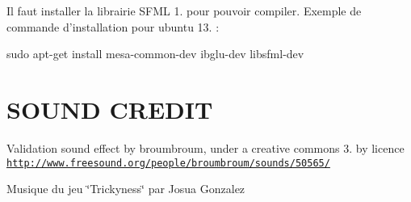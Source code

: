Il faut installer la librairie S\-F\-M\-L 1. pour pouvoir compiler. Exemple de commande d'installation pour ubuntu 13. \-:

sudo apt-\/get install mesa-\/common-\/dev ibglu-\/dev libsfml-\/dev

\section*{S\-O\-U\-N\-D C\-R\-E\-D\-I\-T}

Validation sound effect by broumbroum, under a creative commons 3. by licence \href{http://www.freesound.org/people/broumbroum/sounds/50565/}{\tt http\-://www.\-freesound.\-org/people/broumbroum/sounds/50565/}

Musique du jeu \char`\"{}\-Trickyness\char`\"{} par Josua Gonzalez 